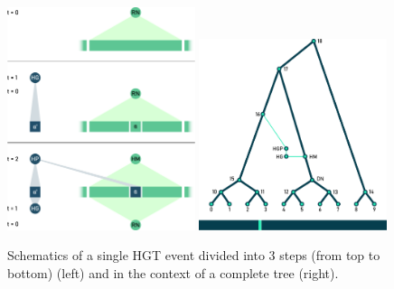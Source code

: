 \begin{figure}[]
    \centering
    \includegraphics[width=0.49\textwidth]{figures/hgt.pdf}
    \includegraphics[width=0.49\textwidth]{figures/tree_with_hgt.pdf}
    \caption[Logic of HGT events.]{Schematics of a single HGT event divided into 3 steps (from top to bottom) (left) and in the context of a complete tree (right).}
    \label{fig:hgt-tree-hgt}
\end{figure}

